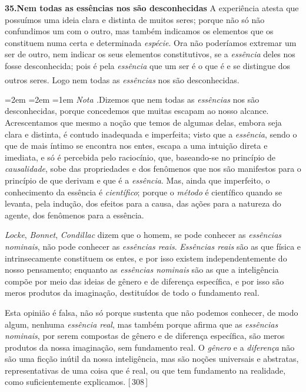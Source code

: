 \documentclass[12pt,a4paper]{article}
\newcommand{\pg}[1]{\thinspace\textup{[\,#1\,]}\thinspace}
\newcommand{\tese}[2]{\bigskip\noindent\textbf{#1.\quad #2}\;\textemdash\;}
\renewcommand\footnote[1]{%
    \stepcounter{footnote}\textsuperscript{\thefootnote}%
    \par
    {\footnotesize
     \leftskip=2em \rightskip=2em \parindent=1em
     \addvspace{\medskipamount}%
     \noindent\textit{Nota \thefootnote.}\enspace #1\par
     \addvspace{\medskipamount}}%
  }
\begin{document}
\tese{35}{Nem todas as essências nos são desconhecidas} A experiência atesta
que possuímos uma ideia clara e distinta de muitos seres; porque não só não
confundimos um com o outro, mas também indicamos os elementos que os constituem
numa certa e determinada \emph{espécie}. Ora não poderíamos extremar um ser de
outro, nem indicar os seus elementos constitutivos, se a \emph{essência} deles
nos fosse desconhecida; pois é pela \emph{essência} que um ser é o que é e se
distingue dos outros seres. Logo nem todas as \emph{essências} nos são
desconhecidas.\footnote{Dizemos que nem todas as \emph{essências} nos são
desconhecidas, porque concedemos que muitas escapam ao nosso alcance.
Acrescentamos que mesmo a noção que temos de algumas delas, embora seja clara e
distinta, é contudo inadequada e imperfeita; visto que a \emph{essência}, sendo
o que de mais íntimo se encontra nos entes, escapa a uma intuição direta e
imediata, e só é percebida pelo raciocínio, que, baseando-se no princípio de
\emph{causalidade}, sobe das propriedades e dos fenômenos que nos são
manifestos para o princípio de que derivam e que é a \emph{essência}.
\textemdash{} Mas, ainda que imperfeito, o conhecimento da essência é
\emph{científico}; porque o \emph{método} é científico quando se levanta, pela
indução, dos efeitos para a causa, das ações para a natureza do agente, dos
fenômenos para a essência.

  \emph{Locke}, \emph{Bonnet}, \emph{Condillac} dizem que o homem, se pode
  conhecer as \emph{essências nominais}, não pode conhecer as \emph{essências
  reais}. \textemdash{} \emph{Essências reais} são as que física e
  intrinsecamente constituem os entes, e por isso existem independentemente do
  nosso pensamento; enquanto as \emph{essências nominais} são as que a
  inteligência compõe por meio das ideias de gênero e de diferença específica,
  e por isso são meros produtos da imaginação, destituídos de todo o fundamento
  real.

  Esta opinião é falsa, não só porque sustenta que não podemos conhecer, de
  modo algum, nenhuma \emph{essência real}, mas também porque afirma que as
  \emph{essências nominais}, por serem compostas de gênero e de diferença
  específica, são meros produtos da nossa imaginação, sem fundamento real. O
  \emph{gênero} e a \emph{diferença} não são uma ficção inútil da nossa
  inteligência, mas são noções universais e abstratas, representativas de uma
  coisa que é real, ou que tem fundamento na realidade, como suficientemente
  explicamos. \pg{308}}
\end{document}
